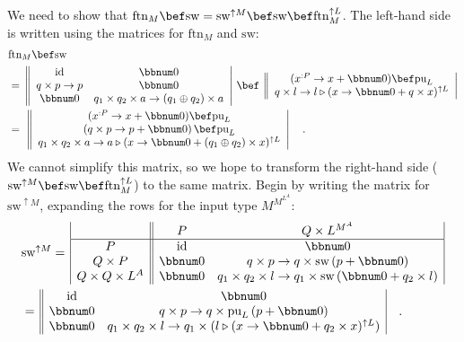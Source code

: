 We need to show that $\text{ftn}_{M}\bef\text{sw}=\text{sw}^{\uparrow M}\bef\text{sw}\bef\text{ftn}_{M}^{\uparrow L}$.
The left-hand side is written using the matrices for $\text{ftn}_{M}$
and $\text{sw}$:
\begin{align}
 & \text{ftn}_{M}\bef\text{sw}\nonumber \\
 & =\,\left\Vert \begin{array}{cc}
\text{id} & \bbnum 0\\
q\times p\rightarrow p & \bbnum 0\\
\bbnum 0 & q_{1}\times q_{2}\times a\rightarrow\left(q_{1}\oplus q_{2}\right)\times a
\end{array}\right|\,\bef\,\left\Vert \begin{array}{c}
(x^{:P}\rightarrow x+\bbnum 0)\bef\text{pu}_{L}\\
q\times l\rightarrow l\triangleright(x\rightarrow\bbnum 0+q\times x)^{\uparrow L}
\end{array}\right|\\
 & =\,\,\left\Vert \begin{array}{c}
(x^{:P}\rightarrow x+\bbnum 0)\bef\text{pu}_{L}\\
\left(q\times p\rightarrow p+\bbnum 0\right)\bef\text{pu}_{L}\\
q_{1}\times q_{2}\times a\rightarrow a\triangleright(x\rightarrow\bbnum 0+\left(q_{1}\oplus q_{2}\right)\times x)^{\uparrow L}
\end{array}\right|\quad.\label{eq:m-interchange-law-of-swap-linear-monads-left-hand-side}
\end{align}
We cannot simplify this matrix, so we hope to transform the right-hand
side ($\text{sw}^{\uparrow M}\bef\text{sw}\bef\text{ftn}_{M}^{\uparrow L}$)
to the same matrix. Begin by writing the matrix for $\text{sw}^{\uparrow M}$,
expanding the rows for the input type $M^{M^{L^{A}}}$:
\begin{align*}
 & \text{sw}^{\uparrow M}=\,\begin{array}{|c||cc|}
 & P & Q\times L^{M^{A}}\\
\hline P & \text{id} & \bbnum 0\\
Q\times P & \bbnum 0 & q\times p\rightarrow q\times\text{sw}\left(p+\bbnum 0\right)\\
Q\times Q\times L^{A} & \bbnum 0 & q_{1}\times q_{2}\times l\rightarrow q_{1}\times\text{sw}\left(\bbnum 0+q_{2}\times l\right)
\end{array}\\
 & =\,\begin{array}{||cc|}
\text{id} & \bbnum 0\\
\bbnum 0 & q\times p\rightarrow q\times\text{pu}_{L}\left(p+\bbnum 0\right)\\
\bbnum 0 & q_{1}\times q_{2}\times l\rightarrow q_{1}\times(l\triangleright(x\rightarrow\bbnum 0+q_{2}\times x)^{\uparrow L})
\end{array}\quad.
\end{align*}
